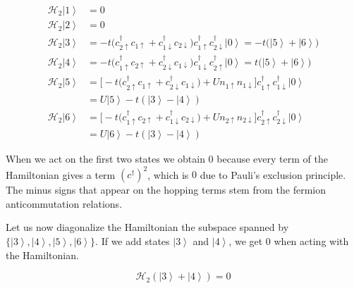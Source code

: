 \begin{equation}
\begin{split}
\mathcal{H}_{2}\left| 1 \right\rangle & = 0 \\
\mathcal{H}_{2}\left| 2 \right\rangle & = 0 \\
\mathcal{H}_{2}\left| 3 \right\rangle & =-t \big(c_{2\uparrow}^\dagger c_{1\uparrow} + c_{1\downarrow}^\dagger c_{2\downarrow} \big)c_{1\uparrow}^\dagger  c_{2\downarrow}^\dagger \left| 0 \right\rangle = -t \big( \left| 5 \right\rangle + \left| 6 \right\rangle \big)  \\
\mathcal{H}_{2}\left| 4 \right\rangle &=-t \big(c_{1\uparrow}^\dagger c_{2\uparrow} + c_{2\downarrow}^\dagger c_{1\downarrow} \big)c_{1\downarrow}^\dagger c_{2\uparrow}^\dagger \left| 0 \right\rangle = t \big( \left| 5 \right\rangle + \left| 6 \right\rangle \big) \\
\mathcal{H}_{2}\left| 5 \right\rangle & =\bigg[ -t \big(c_{2\uparrow}^\dagger c_{1\uparrow} + c_{2\downarrow}^\dagger c_{1\downarrow} \big) + U n_{1\uparrow}n_{1\downarrow}  \bigg]c_{1\uparrow}^\dagger c_{1\downarrow}^\dagger \left| 0 \right\rangle \\
&= U \left| 5 \right\rangle - t ( \left| 3 \right\rangle - \left| 4 \right\rangle )  \\
\mathcal{H}_{2}\left| 6 \right\rangle & = \bigg[ -t \big(c_{1\uparrow}^\dagger c_{2\uparrow} + c_{1\downarrow}^\dagger c_{2\downarrow} \big) + U n_{2\uparrow}n_{2\downarrow}  \bigg]c_{2\uparrow}^\dagger c_{2\downarrow}^\dagger \left| 0 \right\rangle \\
&= U \left| 6 \right\rangle - t ( \left| 3 \right\rangle - \left| 4 \right\rangle ) 
\end{split}
\end{equation}

When we act on the first two states we obtain $0$ because every term of the Hamiltonian gives a term $(c^\dagger)^2$, which is $0$ due to Pauli's exclusion principle. The minus signs that appear on the hopping terms stem from the fermion anticommutation relations.

Let us now diagonalize the Hamiltonian the subspace spanned by $\{\left| 3 \right\rangle, \left| 4 \right\rangle, \left| 5 \right\rangle, \left| 6 \right\rangle \}$. If we add states $\left| 3 \right\rangle$ and $\left| 4 \right\rangle $, we get $0$ when acting with the Hamiltonian. 

\begin{equation}
\mathcal{H}_{2} ( \left| 3 \right\rangle + \left| 4 \right\rangle ) = 0
\end{equation}

